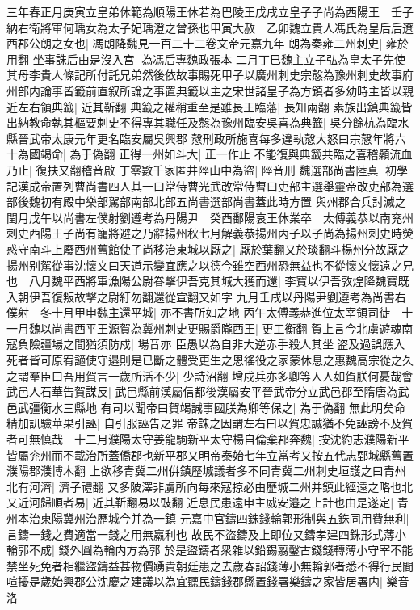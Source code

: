 三年春正月庚寅立皇弟休範為順陽王休若為巴陵王戊戌立皇子子尚為西陽王　壬子納右衛將軍何瑀女為太子妃瑀澄之曾孫也甲寅大赦　乙卯魏立貴人馮氏為皇后后遼西郡公朗之女也|{
	馮朗降魏見一百二十二卷文帝元嘉九年}
朗為秦雍二州刺史|{
	雍於用翻}
坐事誅后由是沒入宫|{
	為馮后專魏政張本}
二月丁巳魏主立子弘為皇太子先使其母李貴人條記所付託兄弟然後依故事賜死甲子以廣州刺史宗慤為豫州刺史故事府州部内論事皆籖前直叙所論之事置典籖以主之宋世諸皇子為方鎮者多幼時主皆以親近左右領典籖|{
	近其靳翻}
典籖之權稍重至是雖長王臨藩|{
	長知兩翻}
素族出鎮典籖皆出納教命執其樞要刺史不得專其職任及慤為豫州臨安吳喜為典籖|{
	吳分餘杭為臨水縣晉武帝太康元年更名臨安屬吳興郡}
慤刑政所施喜每多違執慤大怒曰宗慤年將六十為國竭命|{
	為于偽翻}
正得一州如斗大|{
	正一作止}
不能復與典籖共臨之喜稽顙流血乃止|{
	復扶又翻稽音啟}
丁零數千家匿井陘山中為盜|{
	陘音刑}
魏選部尚書陸真|{
	初學記漢成帝置列曹尚書四人其一曰常侍曹光武改常侍曹曰吏部主選舉靈帝改吏部為選部後魏初有殿中樂部駕部南部北部五尚書選部尚書蓋此時方置}
與州郡合兵討滅之　閏月戊午以尚書左僕射劉遵考為丹陽尹　癸酉鄱陽哀王休業卒　太傅義恭以南兖州刺史西陽王子尚有寵將避之乃辭揚州秋七月解義恭揚州丙子以子尚為揚州刺史時熒惑守南斗上廢西州舊館使子尚移治東城以厭之|{
	厭於葉翻又於琰翻斗楊州分故厭之}
揚州别駕從事沈懷文曰天道示變宜應之以德今雖空西州恐無益也不從懷文懷遠之兄也　八月魏平西將軍漁陽公尉眷擊伊吾克其城大獲而還|{
	李寶以伊吾敦煌降魏寶既入朝伊吾復叛故擊之尉紆勿翻還從宣翻又如字}
九月壬戌以丹陽尹劉遵考為尚書右僕射　冬十月甲申魏主還平城|{
	亦不書所如之地}
丙午太傅義恭進位太宰領司徒　十一月魏以尚書西平王源賀為冀州刺史更賜爵隴西王|{
	更工衡翻}
賀上言今北虜遊魂南寇負險疆場之間猶須防戍|{
	場音亦}
臣愚以為自非大逆赤手殺人其坐盗及過誤應入死者皆可原宥讁使守邉則是已斷之體受更生之恩徭役之家蒙休息之惠魏高宗從之久之謂羣臣曰吾用賀言一歲所活不少|{
	少詩沼翻}
增戍兵亦多卿等人人如賀朕何憂哉會武邑人石華告賀謀反|{
	武邑縣前漢屬信都後漢屬安平晉武帝分立武邑郡至隋唐為武邑武彊衡水三縣地}
有司以聞帝曰賀竭誠事國朕為卿等保之|{
	為于偽翻}
無此明矣命精加訊驗華果引誣|{
	自引服誣告之罪}
帝誅之因謂左右曰以賀忠誠猶不免誣謗不及賀者可無慎哉　十二月濮陽太守姜龍駒新平太守楊自倫棄郡奔魏|{
	按沈約志濮陽新平皆屬兖州而不載治所蓋僑郡也新平郡又明帝泰始七年立當考又按五代志鄄城縣舊置濮陽郡濮博木翻}
上欲移青冀二州倂鎮歷城議者多不同青冀二州刺史垣護之曰青州北有河濟|{
	濟子禮翻}
又多陂澤非虜所向每來寇掠必由歷城二州并鎮此經遠之略也北又近河歸順者易|{
	近其靳翻易以豉翻}
近息民患遠申主威安邉之上計也由是遂定|{
	青州本治東陽冀州治歷城今并為一鎮}
元嘉中官鑄四銖錢輪郭形制與五銖同用費無利|{
	言鑄一錢之費適當一錢之用無羸利也}
故民不盜鑄及上即位又鑄孝建四銖形式薄小輪郭不成|{
	錢外圓為輪内方為郭}
於是盜鑄者衆雜以鉛錫翦鑿古錢錢轉薄小守宰不能禁坐死免者相繼盜鑄益甚物價踴貴朝廷患之去歲春詔錢薄小無輪郭者悉不得行民間喧擾是歲始興郡公沈慶之建議以為宜聽民鑄錢郡縣置錢署樂鑄之家皆居署内|{
	樂音洛}
